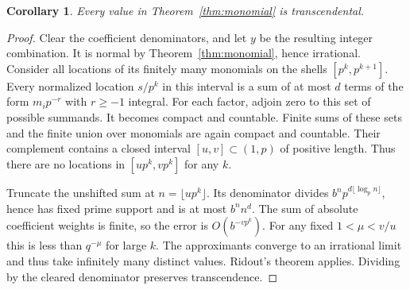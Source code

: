 \documentclass[11pt]{article}
\newtheorem{corollary}[theorem]{Corollary}
\begin{document}
\begin{corollary}\label{cor:axis-trans}
Every value in Theorem~\ref{thm:monomial} is transcendental.
\end{corollary}
\begin{proof}
Clear the coefficient denominators, and let $y$ be the resulting integer combination.
It is normal by Theorem~\ref{thm:monomial}, hence irrational. Consider all locations
of its finitely many monomials on the shells $[p^k,p^{k+1}]$. Every normalized location
$s/p^k$ in this interval is a sum of at most $d$ terms of the form $m_i p^{-r}$ with $r\ge-1$ integral. For each factor, adjoin zero to this set of possible summands.
It becomes compact and countable. Finite sums of these sets and the finite union over
monomials are again compact and countable. Their complement contains a closed interval
$[u,v]\subset(1,p)$ of positive length. Thus there are no locations in
$[up^k,vp^k]$ for any $k$.

Truncate the unshifted sum at $n=\lfloor up^k\rfloor$. Its denominator divides
$b^n p^{d\lfloor\log_p n\rfloor}$, hence has fixed prime support and is at most $b^n n^d$.
The sum of absolute coefficient weights is finite, so the error is $O(b^{-vp^k})$.
For any fixed $1<\mu<v/u$ this is less than $q^{-\mu}$ for large $k$.
The approximants converge to an irrational limit and thus take infinitely many distinct
values. Ridout's theorem applies. Dividing by the cleared denominator preserves transcendence.
\end{proof}
\end{document}
